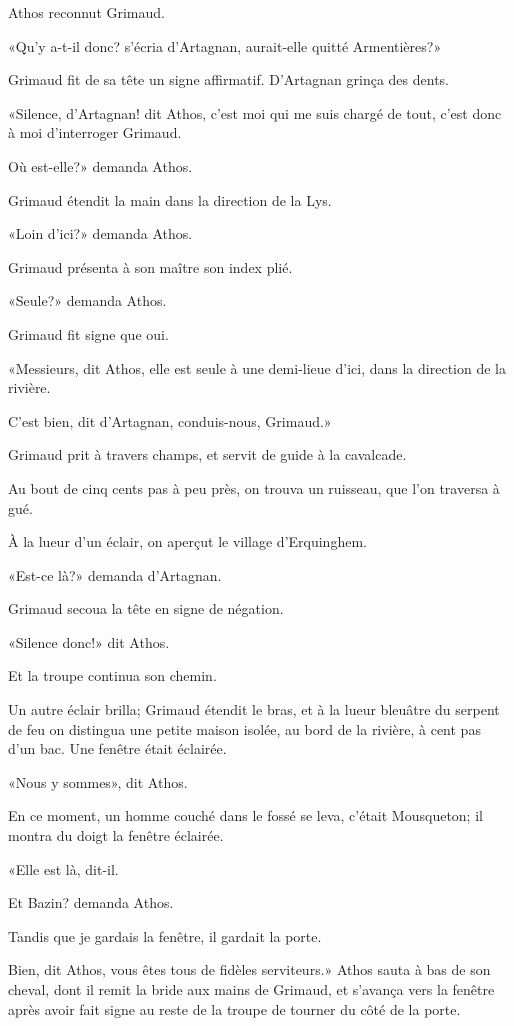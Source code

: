 Athos reconnut Grimaud. 

«Qu'y a-t-il donc? s'écria d'Artagnan, aurait-elle quitté Armentières?» 

Grimaud fit de sa tête un signe affirmatif. D'Artagnan grinça des dents. 

«Silence, d'Artagnan! dit Athos, c'est moi qui me suis chargé de tout, c'est donc à moi d'interroger Grimaud. 

\speak  Où est-elle?» demanda Athos. 

Grimaud étendit la main dans la direction de la Lys. 

«Loin d'ici?» demanda Athos. 

Grimaud présenta à son maître son index plié. 

«Seule?» demanda Athos. 

Grimaud fit signe que oui. 

«Messieurs, dit Athos, elle est seule à une demi-lieue d'ici, dans la direction de la rivière. 

\speak  C'est bien, dit d'Artagnan, conduis-nous, Grimaud.» 

Grimaud prit à travers champs, et servit de guide à la cavalcade. 

Au bout de cinq cents pas à peu près, on trouva un ruisseau, que l'on traversa à gué. 

À la lueur d'un éclair, on aperçut le village d'Erquinghem. 

«Est-ce là?» demanda d'Artagnan. 

Grimaud secoua la tête en signe de négation. 

«Silence donc!» dit Athos. 

Et la troupe continua son chemin. 

Un autre éclair brilla; Grimaud étendit le bras, et à la lueur bleuâtre du serpent de feu on distingua une petite maison isolée, au bord de la rivière, à cent pas d'un bac. Une fenêtre était éclairée. 

«Nous y sommes», dit Athos. 

En ce moment, un homme couché dans le fossé se leva, c'était Mousqueton; il montra du doigt la fenêtre éclairée. 

«Elle est là, dit-il. 

\speak  Et Bazin? demanda Athos. 

\speak  Tandis que je gardais la fenêtre, il gardait la porte. 

\speak  Bien, dit Athos, vous êtes tous de fidèles serviteurs.» Athos sauta à bas de son cheval, dont il remit la bride aux mains de Grimaud, et s'avança vers la fenêtre après avoir fait signe au reste de la troupe de tourner du côté de la porte. 

